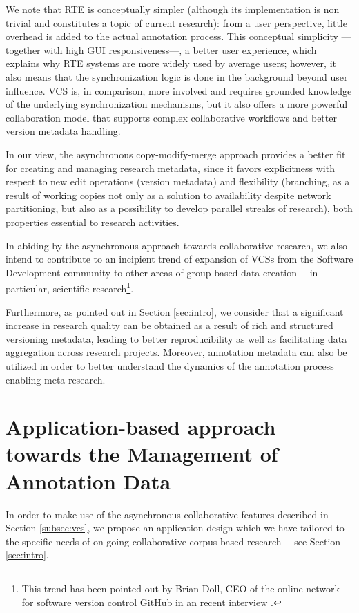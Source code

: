 \documentclass{sig-alternate}
\begin{document}
We note that RTE is conceptually simpler (although its implementation is non trivial and 
constitutes a topic of current research): from a user perspective, little overhead is added to
the actual annotation process.
This conceptual simplicity ---together with high GUI responsiveness---,
a better user experience, which explains why RTE systems are more widely used by average users;
however, it also means that the synchronization logic is done in the background beyond user
influence.
VCS is, in comparison, more involved and requires grounded knowledge of the underlying
synchronization mechanisms, but it also offers a more powerful collaboration model that
supports complex collaborative workflows and better version metadata handling.

In our view, the asynchronous copy-modify-merge approach provides a
better fit for creating and managing research metadata, since it favors explicitness with
respect to new edit operations (version metadata) and flexibility (branching, as a result of
working copies not only as a solution to availability despite network
partitioning, but also as a possibility to develop parallel streaks of research),
both properties essential to research activities.

In abiding by the asynchronous approach towards collaborative research, we also intend to
contribute to an incipient trend of expansion of VCSs from the Software Development community
to other areas of group-based data creation ---in particular, scientific research\footnote{
  This trend has been pointed out by Brian Doll, CEO of the online network for software version
  control GitHub in an recent interview \cite{Begel2013}.
}.

Furthermore, as pointed out in Section \ref{sec:intro}, we consider that a significant increase in
research quality can be obtained as a result of rich and structured versioning metadata,
leading to better reproducibility as well as facilitating data aggregation across research
projects. Moreover, annotation metadata can also be utilized in order to better understand
the dynamics of the annotation process enabling meta-research.

\section{Application-based approach towards the Management of Annotation Data}\label{sec:case}

In order to make use of the asynchronous collaborative features described in Section
\ref{subsec:vcs}, we propose an application design which we have tailored to the specific needs
of on-going collaborative corpus-based research ---see Section \ref{sec:intro}.
\end{document}
